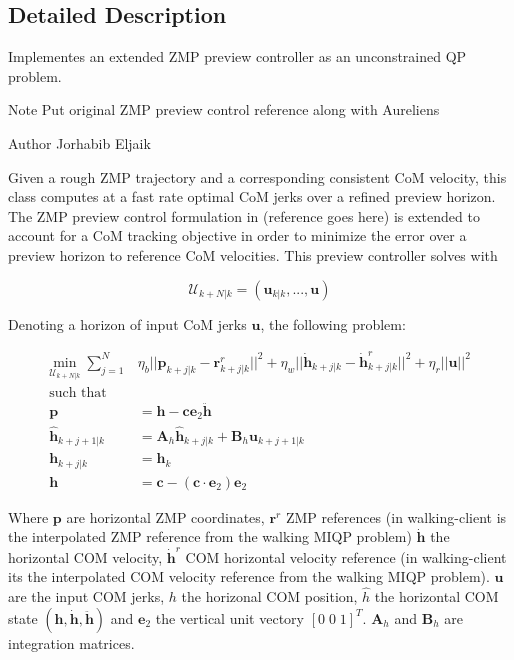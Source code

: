 \subsection{Detailed Description}
Implementes an extended Z\+MP preview controller as an unconstrained QP problem. 

\begin{DoxyNote}{Note}
Put original Z\+MP preview control reference along with Aurelien\textquotesingle{}s
\end{DoxyNote}
\begin{DoxyAuthor}{Author}
Jorhabib Eljaik
\end{DoxyAuthor}
Given a rough Z\+MP trajectory and a corresponding consistent CoM velocity, this class computes at a fast rate optimal CoM jerks over a refined preview horizon. The Z\+MP preview control formulation in (reference goes here) is extended to account for a CoM tracking objective in order to minimize the error over a preview horizon to reference CoM velocities. This preview controller solves with

\[ \mathcal{U}_{k+N|k} = (\mathbf{u}_{k|k}, ... , \mathbf{u}) \]

Denoting a horizon of input CoM jerks $\mathbf{u}$, the following problem\+:

\begin{align*} \underset{\mathcal{U}_{k+N|k}}{\text{min}} \; \sum_{j=1}^{N} & \eta_b || \mathbf{p}_{k+j|k} - \mathbf{r}_{k+j|k}^r ||^2 + \eta_w ||\mathbf{\dot{h}}_{k+j|k} - \dot{\mathbf{h}}^r_{k+j|k} ||^2 + \eta_r || \mathbf{u} ||^2 \\ \text{such that}&\\ \mathbf{p} &= \mathbf{h} - \mathbf{c}\mathbf{e}_2 \mathbf{\ddot{h}} \\ \mathbf{\hat{h}}_{k+j+1|k} &= \mathbf{A}_h \hat{\mathbf{h}}_{k+j|k} + \mathbf{B}_h \mathbf{u}_{k+j+1|k} \\ \mathbf{h}_{k+j|k} &= \mathbf{h}_k\\ \mathbf{h} &= \mathbf{c} - (\mathbf{c}\cdot\mathbf{e}_2)\mathbf{e}_2 \end{align*}

Where $\mathbf{p}$ are horizontal Z\+MP coordinates, $ \mathbf{r}^r $ Z\+MP references (in walking-\/client is the interpolated Z\+MP reference from the walking M\+I\+QP problem) $ \mathbf{\dot{h}} $ the horizontal C\+OM velocity, $ \mathbf{\dot{h}}^r $ C\+OM horizontal velocity reference (in walking-\/client it\textquotesingle{}s the interpolated C\+OM velocity reference from the walking M\+I\+QP problem). $\mathbf{u}$ are the input C\+OM jerks, $h$ the horizonal C\+OM position, $\hat{h}$ the horizontal C\+OM state $ (\mathbf{h}, \mathbf{\dot{h}}, \mathbf{\ddot{h}}) $ and $\mathbf{e}_2$ the vertical unit vectory $ [0\;0\;1]^T$. $\mathbf{A}_h$ and $\mathbf{B}_h$ are integration matrices. 

